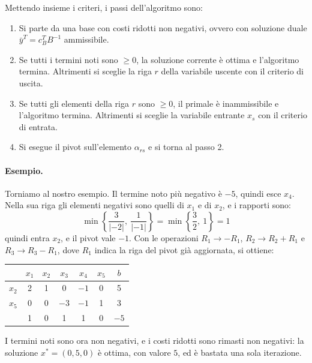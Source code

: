 Mettendo insieme i criteri, i passi dell'algoritmo sono:
\begin{enumerate}
    \item Si parte da una base con costi ridotti non negativi, ovvero con soluzione duale $\bar{y}^T = c_B^T B^{-1}$ ammissibile.
    \item Se tutti i termini noti sono $\ge 0$, la soluzione corrente è ottima e l'algoritmo termina. Altrimenti si sceglie la riga $r$ della variabile uscente con il criterio di uscita.
    \item Se tutti gli elementi della riga $r$ sono $\ge 0$, il primale è inammissibile e l'algoritmo termina. Altrimenti si sceglie la variabile entrante $x_s$ con il criterio di entrata.
    \item Si esegue il pivot sull'elemento $\alpha_{rs}$ e si torna al passo 2.
\end{enumerate}

\paragraph{Esempio.}
Torniamo al nostro esempio. Il termine noto più negativo è $-5$, quindi esce $x_4$. Nella sua riga gli elementi negativi sono quelli di $x_1$ e di $x_2$, e i rapporti sono:
\[
\min \left\{ \frac{3}{|-2|},\ \frac{1}{|-1|} \right\} = \min \left\{ \frac32,\ 1 \right\} = 1
\]
quindi entra $x_2$, e il pivot vale $-1$. Con le operazioni $R_1 \to -R_1$, $R_2 \to R_2 + R_1$ e $R_3 \to R_3 - R_1$, dove $R_1$ indica la riga del pivot già aggiornata, si ottiene:
\begin{center}
\begin{tabular}{c|ccccc|c}
 & $x_1$ & $x_2$ & $x_3$ & $x_4$ & $x_5$ & $b$ \\
\hline
$x_2$ & 2 & 1 & 0 & $-1$ & 0 & 5 \\
$x_5$ & 0 & 0 & $-3$ & $-1$ & 1 & 3 \\
\hline
 & 1 & 0 & 1 & 1 & 0 & $-5$ \\
\end{tabular}
\end{center}
I termini noti sono ora non negativi, e i costi ridotti sono rimasti non negativi: la soluzione $x^* = (0, 5, 0)$ è ottima, con valore $5$, ed è bastata una sola iterazione.

